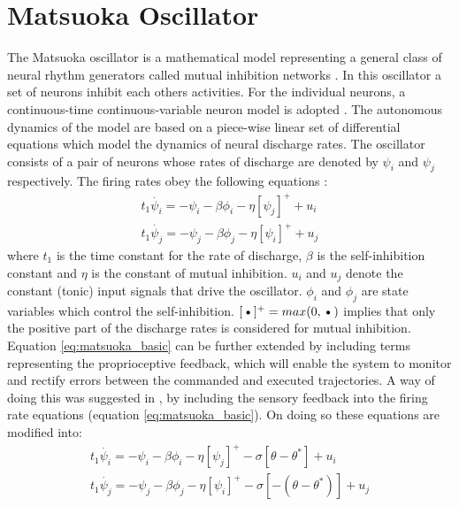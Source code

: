 \documentclass[12pt,twoside]{article}
\theoremstyle{plain}
\theoremstyle{definition}
\theoremstyle{remark}
\begin{document}
\section{Matsuoka Oscillator}
\label{sec:Matsuoka_Oscillator}
The Matsuoka oscillator is a mathematical model representing a general class of neural rhythm generators called mutual inhibition networks \cite{Matsuoka1987}. In this oscillator a set of neurons inhibit each others activities. For the individual neurons, a continuous-time continuous-variable neuron model is adopted \cite{Matsuoka1987}. The autonomous dynamics of the model are based on a piece-wise linear set of differential equations which model the dynamics of neural discharge rates. The oscillator consists of a pair of neurons whose rates of discharge are denoted by $\psi_i$ and $\psi_j$ respectively. The firing rates obey the following equations \cite{Ronsse2009}: 
\begin{subequations} 
\label{eq:matsuoka_basic}
\begin{align}
 t_1 \dot{\psi_i}=-\psi_i - \beta \phi_i - \eta [\psi_j]^+ + u_i\\
 t_1 \dot{\psi_j}=-\psi_j - \beta \phi_j - \eta [\psi_i]^+ + u_j
 \end{align}
\end{subequations}
where $t_1$ is the time constant for the rate of discharge, $\beta$ is the self-inhibition constant and $\eta$ is the constant of mutual inhibition. $u_i$ and $u_j$ denote the constant (tonic) input signals that drive the oscillator. $\phi_i$ and $\phi_j$ are state variables which control the self-inhibition. $[\textbf{\textbullet}]^+=max(0,\textbf{\textbullet})$ implies that only the positive part of the discharge rates is considered for mutual inhibition. Equation  \ref{eq:matsuoka_basic} can be further extended by including terms representing the proprioceptive feedback, which will enable the system to monitor and rectify errors between the commanded and executed trajectories. A way of doing this was suggested in \cite{Williamson1998}, by including the sensory feedback into the firing rate equations (equation \ref{eq:matsuoka_basic}). On doing so these equations are modified into:
\begin{subequations} 
\label{eq:matsuoka_extended}
\begin{align}
 t_1 \dot{\psi_i}=-\psi_i - \beta \phi_i - \eta [\psi_j]^+ - \sigma [\theta - \theta^{*}] + u_i\\
 t_1 \dot{\psi_j}=-\psi_j - \beta \phi_j - \eta [\psi_i]^+ - \sigma [-(\theta - \theta^{*})] + u_j
 \end{align}
\end{subequations}
\end{document}
